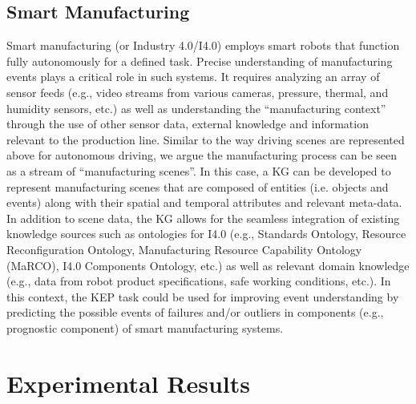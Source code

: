\documentclass[conference]{IEEEtran}
\begin{document}
\subsection{Smart Manufacturing}
Smart manufacturing (or Industry 4.0/I4.0) \cite{wang2021smart} employs smart robots that function fully autonomously for a defined task. Precise understanding of manufacturing events plays a critical role in such systems. It requires analyzing an array of sensor feeds (e.g.,  video streams from various cameras, pressure, thermal, and humidity sensors, etc.) as well as understanding the ``manufacturing context” through the use of other sensor data, external knowledge and information relevant to the production line. Similar to the way driving scenes are represented above for autonomous driving, we argue the manufacturing process can be seen as a stream of ``manufacturing scenes”. In this case, a KG can be developed to represent manufacturing scenes that are composed of entities (i.e. objects and events) along with their spatial and temporal attributes and relevant meta-data. In addition to scene data, the KG allows for the seamless integration of existing knowledge sources such as ontologies for I4.0 (e.g., Standards Ontology, Resource Reconfiguration Ontology, Manufacturing Resource Capability Ontology
(MaRCO), I4.0 Components Ontology, etc.)\cite{yahya2021industry} as well as relevant domain knowledge (e.g., data from robot product specifications, safe working conditions, etc.). In this context, the KEP task could be used for improving event understanding by predicting the possible events of failures and/or outliers in components (e.g., prognostic component)  of smart manufacturing systems. 


\section{Experimental Results}
\label{sec:results}
\end{document}
